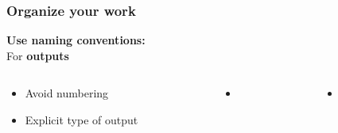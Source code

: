 \documentclass[xcolor=x11names,compress]{beamer}
\renewcommand{\(}{\begin{columns}}
\renewcommand{\)}{\end{columns}}
\newcommand{\<}[1]{\begin{column}{#1}}
\renewcommand{\>}{\end{column}}
\begin{document}
\begin{frame}
\frametitle{Organize your work }
\textcolor{siap}{\textbf{Use naming conventions:} \\ }
For \textbf{outputs}
\begin{columns}[t]
 \begin{column}{0.3\textwidth}
    \begin{itemize}[<+->]
   \item Avoid numbering
   \item Explicit type of output
    \end{itemize}
\end{column}
  \begin{column}{0.2\textwidth}
    \begin{itemize}
    \item[]
    \end{itemize}
  \end{column}
  \begin{column}{0.5\textwidth}
    \begin{itemize}
    \item[]
    \end{itemize}
  \end{column}
\end{columns}
\end{frame}
\end{document}
